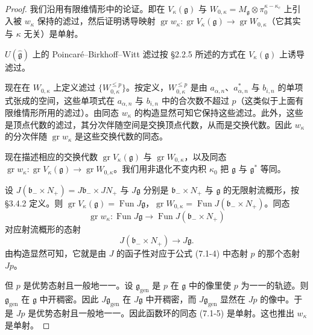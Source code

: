 \begin{proof}
我们沿用有限维情形中的论证。即在 $V_\kappa(\mathfrak{g})$ 与 $W_{0,\kappa}=M_{\mathfrak{g}}\otimes\pi_0^{\kappa-\kappa_c}$ 上引入被 $w_\kappa$ 保持的滤过，然后证明诱导映射 $\operatorname{gr}w_\kappa:\operatorname{gr}V_\kappa(\mathfrak{g})\to\operatorname{gr}W_{0,\kappa}$（它其实与 $\kappa$ 无关）是单射。

$U(\hat{\mathfrak{g}})$ 上的 Poincaré--Birkhoff--Witt 滤过按 §2.2.5 所述的方式在 $V_\kappa(\mathfrak{g})$ 上诱导滤过。

现在在 $W_{0,\kappa}$ 上定义滤过 $\{W^{\le p}_{0,\kappa}\}$。按定义，$W^{\le p}_{0,\kappa}$ 是由 $a_{\alpha,n}$、$a^*_{\alpha,n}$ 与 $b_{i,n}$ 的单项式张成的空间，这些单项式在 $a_{\alpha,n}$ 与 $b_{i,n}$ 中的合次数不超过 $p$（这类似于上面有限维情形所用的滤过）。由同态 $w_\kappa$ 的构造显然可知它保持这些滤过。此外，这些是顶点代数的滤过，其分次伴随空间是交换顶点代数，从而是交换代数。因此 $w_\kappa$ 的分次伴随 $\operatorname{gr}w_\kappa$ 是这些交换代数的同态。

现在描述相应的交换代数 $\operatorname{gr}V_\kappa(\mathfrak{g})$ 与 $\operatorname{gr}W_{0,\kappa}$，以及同态 $\operatorname{gr}w_\kappa:\operatorname{gr}V_\kappa(\mathfrak{g})\to\operatorname{gr}W_{0,\kappa}$。我们用非退化不变内积 $\kappa_0$ 把 $\mathfrak{g}$ 与 $\mathfrak{g}^*$ 等同。

设 $J(\mathfrak{b}_-\times N_+)=J\mathfrak{b}_-\times JN_+$ 与 $J\mathfrak{g}$ 分别是 $\mathfrak{b}_-\times N_+$ 与 $\mathfrak{g}$ 的无限射流概形，按 §3.4.2 定义。则 $\operatorname{gr}V_\kappa(\mathfrak{g})=\operatorname{Fun}J\mathfrak{g}$，$\operatorname{gr}W_{0,\kappa}=\operatorname{Fun}J(\mathfrak{b}_-\times N_+)$。同态
\begin{equation}
    \operatorname{gr}w_\kappa:\operatorname{Fun}J\mathfrak{g}\longrightarrow\operatorname{Fun}J(\mathfrak{b}_-\times N_+)
    \tag{7.1-5}
\end{equation}
对应射流概形的态射
\[
    J(\mathfrak{b}_-\times N_+)\longrightarrow J\mathfrak{g}.
\]
由构造显然可知，它就是由 $J$ 的函子性对应于公式 (7.1-4) 中态射 $p$ 的那个态射 $Jp$。

但 $p$ 是优势态射且一般地一一。设 $\mathfrak{g}_{\mathrm{gen}}$ 是 $p$ 在 $\mathfrak{g}$ 中的像里使 $p$ 为一一的轨迹。则 $\mathfrak{g}_{\mathrm{gen}}$ 在 $\mathfrak{g}$ 中开稠密。因此 $J\mathfrak{g}_{\mathrm{gen}}$ 在 $J\mathfrak{g}$ 中开稠密，而 $J\mathfrak{g}_{\mathrm{gen}}$ 显然在 $Jp$ 的像中。于是 $Jp$ 是优势态射且一般地一一。因此函数环的同态 (7.1-5) 是单射。这也推出 $w_\kappa$ 是单射。
\end{proof}

